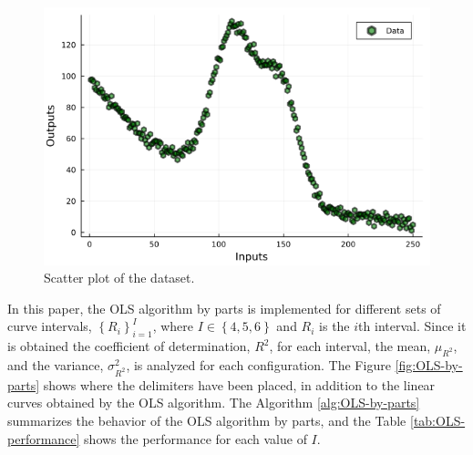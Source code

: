 \documentclass[english]{sobraep}
\begin{document}
\begin{figure}[H]
	\includegraphics[scale=.37]{../figs/scatterplot.png}
	\centering
	\caption{Scatter plot of the dataset.}
	\label{fig:scatterplot}
\end{figure}

In this paper, the OLS algorithm by parts is implemented for different sets of curve intervals, \(\left\{ R_i \right\}_{i=1}^{I}\), where \(I \in \left\{ 4,5,6 \right\}\) and \(R_i\) is the \(i\)th interval. Since it is obtained the coefficient of determination, \(R^2\), for each interval, the mean, \(\mu_{R^2}\), and the variance, \(\sigma_{R^2}^2\), is analyzed for each configuration. The Figure \ref{fig:OLS-by-parts} shows where the delimiters have been placed, in addition to the linear curves obtained by the OLS algorithm. The Algorithm \ref{alg:OLS-by-parts} summarizes the behavior of the OLS algorithm by parts, and the Table \ref{tab:OLS-performance} shows the performance for each value of \(I\).
\end{document}
